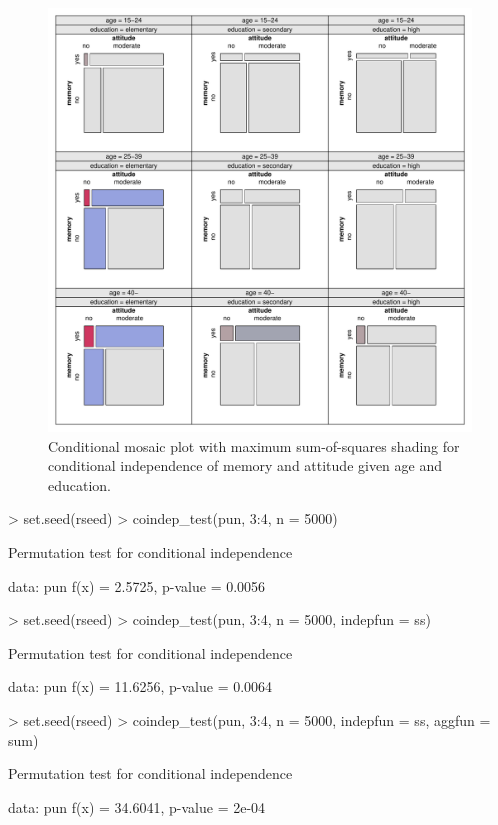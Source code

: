 \documentclass{Z}
\begin{document}
\begin{figure}[t!]
\begin{center}
\includegraphics{residual-shadings-Punishment-mosaic1}
\caption{Conditional mosaic plot with maximum sum-of-squares shading for conditional
independence of memory and attitude given age and education.}
\label{fig:pun2}
\end{center}
\end{figure}

\begin{Schunk}
\begin{Sinput}
> set.seed(rseed)
> coindep_test(pun, 3:4, n = 5000)
\end{Sinput}
\begin{Soutput}
	Permutation test for conditional independence

data:  pun 
f(x) = 2.5725, p-value = 0.0056
\end{Soutput}
\begin{Sinput}
> set.seed(rseed)
> coindep_test(pun, 3:4, n = 5000, indepfun = ss)
\end{Sinput}
\begin{Soutput}
	Permutation test for conditional independence

data:  pun 
f(x) = 11.6256, p-value = 0.0064
\end{Soutput}
\begin{Sinput}
> set.seed(rseed)
> coindep_test(pun, 3:4, n = 5000, indepfun = ss, aggfun = sum)
\end{Sinput}
\begin{Soutput}
	Permutation test for conditional independence

data:  pun 
f(x) = 34.6041, p-value = 2e-04
\end{Soutput}
\end{Schunk}
\end{document}
